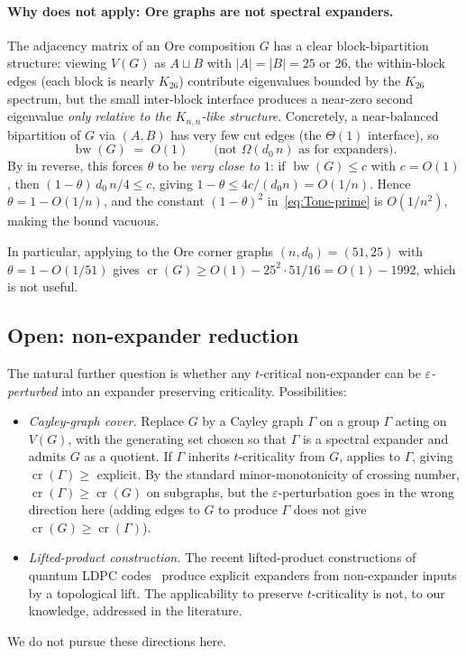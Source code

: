 \documentclass[11pt,a4paper]{article}
\theoremstyle{definition}
\DeclareMathOperator{\crN}{cr}
\DeclareMathOperator{\bw}{bw}
\newcommand{\eps}{\varepsilon}
\begin{document}
\paragraph{Why  does not apply: Ore graphs are
not spectral expanders.}
The adjacency matrix of an Ore composition $G$ has a clear
block-bipartition structure: viewing $V(G)$ as $A \sqcup B$ with
$|A| = |B| = 25$ or $26$, the within-block edges (each block is
nearly $K_{26}$) contribute eigenvalues bounded by the $K_{26}$
spectrum, but the small inter-block interface produces a
near-zero second eigenvalue \emph{only relative to the
$K_{n,n}$-like structure}. Concretely, a near-balanced
bipartition of $G$ via $(A, B)$ has very few cut edges (the
$\Theta(1)$ interface), so
\[
   \bw(G) \;=\; O(1) \qquad \text{(not $\Omega(d_0\,n)$ as for expanders)}.
\]
By  in reverse, this forces $\theta$ to be
\emph{very close to $1$}: if $\bw(G) \le c$ with $c = O(1)$, then
$(1 - \theta)\,d_0\,n/4 \le c$, giving
$1 - \theta \le 4 c / (d_0 n) = O(1/n)$. Hence $\theta = 1 - O(1/n)$,
and the constant $(1 - \theta)^{2}$ in~\eqref{eq:Tone-prime} is
$O(1/n^{2})$, making the bound vacuous.

In particular, applying  to the Ore corner graphs
$(n, d_0) = (51, 25)$ with $\theta = 1 - O(1/51)$ gives
$\crN(G) \ge O(1) - 25^{2} \cdot 51 / 16 = O(1) - 1992$, which is
not useful.

\subsection{Open: non-expander reduction}\label{ssec:reduction}

The natural further question is whether any $t$-critical
non-expander can be \emph{$\eps$-perturbed} into an expander
preserving criticality. Possibilities:
\begin{itemize}
\item \emph{Cayley-graph cover.} Replace $G$ by a Cayley graph
  $\Gamma$ on a group $\Gamma$ acting on $V(G)$, with the
  generating set chosen so that $\Gamma$ is a spectral expander
  and admits $G$ as a quotient. If $\Gamma$ inherits
  $t$-criticality from $G$,  applies to
  $\Gamma$, giving $\crN(\Gamma) \ge $ explicit. By
  the standard minor-monotonicity of crossing number,
  $\crN(\Gamma) \ge \crN(G)$ on subgraphs, but the
  $\eps$-perturbation goes in the wrong direction here (adding
  edges to $G$ to produce $\Gamma$ does not give $\crN(G) \ge
  \crN(\Gamma)$).
\item \emph{Lifted-product construction.} The recent lifted-product
  constructions of quantum LDPC codes~\cite{PanteleevKalachev}
  produce explicit expanders from non-expander
  inputs by a topological lift. The applicability to
  preserve $t$-criticality is not, to our knowledge, addressed
  in the literature.
\end{itemize}
We do not pursue these directions here.
\end{document}
